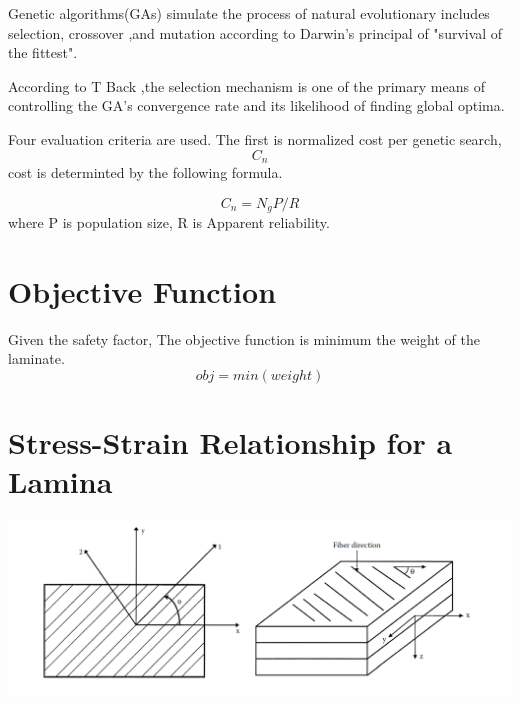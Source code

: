 \documentclass[smallextended]{svjour3}       %
\begin{document}

Genetic algorithms(GAs) simulate the process of natural evolutionary includes selection, crossover ,and mutation  according to Darwin's principal of "survival of the fittest".

According to T Back \cite{back1994selective},the selection mechanism is one of the primary means of controlling the GA's convergence rate and its
likelihood of finding global optima.


Four evaluation criteria are used. 
The first is normalized cost per genetic search, $$C_{n}$$
cost is determinted by the following formula.

$$C_{n} = N_{g}P/R$$
where P is population size, R is Apparent reliability.


\section{Objective Function}

Given the safety factor, The objective function is minimum the weight of the laminate.
\begin{equation*}\label{strength-ratio}
	obj=min(weight) 
\end{equation*}


\section{Stress-Strain Relationship for a Lamina}

\begin{center}
  \includegraphics[width=\linewidth]{A_laminate_design_images/lamina_local_global_axes.png}
  \label{fig:lamina}
\end{center}
\end{document}
